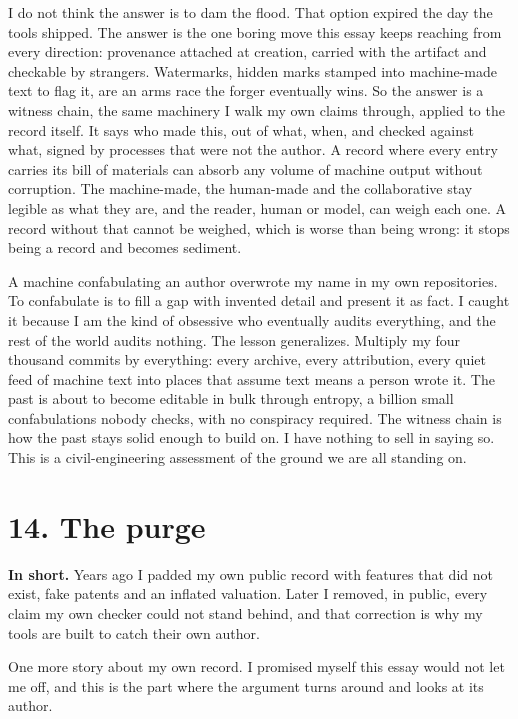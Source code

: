 \documentclass[11pt]{article}
\begin{document}
I do not think the answer is to dam the flood. That option expired the day the tools shipped. The answer is the one boring move this essay keeps reaching from every direction: provenance attached at creation, carried with the artifact and checkable by strangers. Watermarks, hidden marks stamped into machine-made text to flag it, are an arms race the forger eventually wins. So the answer is a witness chain, the same machinery I walk my own claims through, applied to the record itself. It says who made this, out of what, when, and checked against what, signed by processes that were not the author. A record where every entry carries its bill of materials can absorb any volume of machine output without corruption. The machine-made, the human-made and the collaborative stay legible as what they are, and the reader, human or model, can weigh each one. A record without that cannot be weighed, which is worse than being wrong: it stops being a record and becomes sediment.

A machine confabulating an author overwrote my name in my own repositories. To confabulate is to fill a gap with invented detail and present it as fact. I caught it because I am the kind of obsessive who eventually audits everything, and the rest of the world audits nothing. The lesson generalizes. Multiply my four thousand commits by everything: every archive, every attribution, every quiet feed of machine text into places that assume text means a person wrote it. The past is about to become editable in bulk through entropy, a billion small confabulations nobody checks, with no conspiracy required. The witness chain is how the past stays solid enough to build on. I have nothing to sell in saying so. This is a civil-engineering assessment of the ground we are all standing on.

\section*{14. The purge}

\textbf{In short.} Years ago I padded my own public record with features that did not exist, fake patents and an inflated valuation. Later I removed, in public, every claim my own checker could not stand behind, and that correction is why my tools are built to catch their own author.

One more story about my own record. I promised myself this essay would not let me off, and this is the part where the argument turns around and looks at its author.
\end{document}
